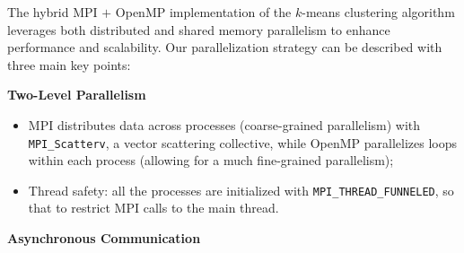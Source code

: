 \documentclass[11pt, journal]{IEEEtran}
\newcommand{\nwl}{

\vspace{11pt}

}
\begin{document}
The hybrid MPI $+$ OpenMP implementation of the $k$-means clustering algorithm leverages both distributed and shared memory parallelism to enhance performance and scalability. Our parallelization strategy can be described with three main key points:
\nwl
\noindent \textbf{Two-Level Parallelism}
\begin{itemize}
    \item MPI distributes data across processes (coarse-grained parallelism) with \texttt{MPI\_Scatterv}, a vector scattering collective, while OpenMP parallelizes loops within each process (allowing for a much fine-grained parallelism);
    \item Thread safety: all the processes are initialized with \texttt{MPI\_THREAD\_FUNNELED}, so that to restrict MPI calls to the main thread.
\end{itemize}
\nwl
\noindent \textbf{Asynchronous Communication}
\end{document}
